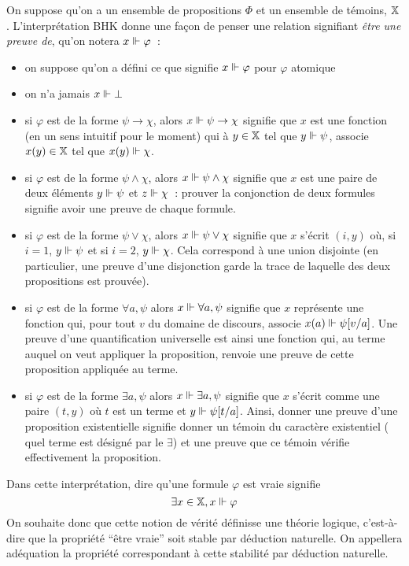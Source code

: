 \documentclass{article}
\begin{document}
On suppose qu'on a un ensemble de propositions $\Phi$ et un ensemble de témoins, $\mathbb X$. L'interprétation BHK donne une façon de penser une relation signifiant \textit{être une preuve de}, qu'on notera $x\Vdash \varphi$~:
\begin{itemize}
\item on suppose qu'on a défini ce que signifie $x\Vdash\varphi$ pour $\varphi$ atomique
\item on n'a jamais $x\Vdash \bot$
\item {} si $\varphi$ est de la forme $\psi\to \chi$, alors $x\Vdash\psi \to\chi$ signifie que $x$ est une fonction (en un sens intuitif pour le moment) qui à $y\in \mathbb X$ tel que $y\Vdash \psi$, associe $x(y)\in \mathbb X$ tel que $x(y)\Vdash \chi$.
\item si $\varphi$ est de la forme $\psi\land\chi$, alors $x\Vdash \psi\land \chi$ signifie que $x$ est une paire de deux éléments $y\Vdash \psi$ et $z\Vdash \chi$~: prouver la conjonction de deux formules signifie avoir une preuve de chaque formule.
\item si $\varphi$ est de la forme $\psi\lor\chi$, alors $x\Vdash\psi\lor \chi$ signifie que $x$ s'écrit $(i,y)$ où, si $i = 1$, $y\Vdash \psi$ et si $i = 2$, $y\Vdash \chi$. Cela correspond à une union disjointe (en particulier, une preuve d'une disjonction garde la trace de laquelle des deux propositions est prouvée).
\item si $\varphi$ est de la forme $\forall a, \psi$ alors $x\Vdash\forall a, \psi$ signifie que $x$ représente une fonction qui, pour tout $v$ du domaine de discours,  associe $x(a)\Vdash \psi[v/a]$. Une preuve d'une quantification universelle est ainsi une fonction qui, au terme auquel on veut appliquer la proposition, renvoie une preuve de cette proposition appliquée au terme.
\item si $\varphi$ est de la forme $\exists a, \psi$ alors $x\Vdash \exists a, \psi$ signifie que $x$ s'écrit comme une paire $(t,y)$ où $t$ est un terme et $y\Vdash \psi[t/a]$. Ainsi, donner une preuve d'une proposition existentielle signifie donner un témoin du caractère existentiel ( quel terme est désigné par le $\exists$) et une preuve que ce témoin vérifie effectivement la proposition.
\end{itemize}

Dans cette interprétation, dire qu'une formule $\varphi$ est vraie signifie
\[\exists x \in \mathbb X, x \Vdash \varphi\]
On souhaite donc que cette notion de vérité définisse une théorie logique, c'est-à-dire que la propriété ``être vraie'' soit stable par déduction naturelle. On appellera adéquation la propriété correspondant à cette stabilité par déduction naturelle.
\end{document}

